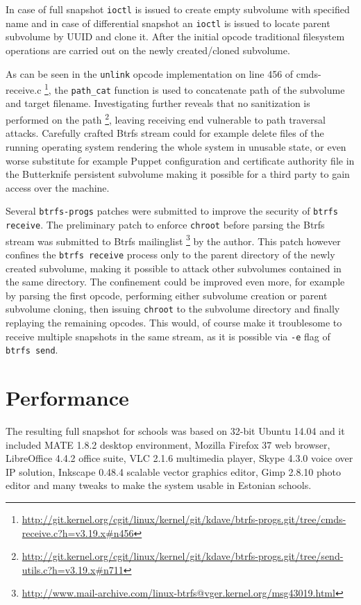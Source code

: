 \documentclass[a4paper,11pt]{kth-mag}
\begin{document}
In case of full snapshot \texttt{ioctl} is issued to
create empty subvolume with specified name and
in case of differential snapshot an \texttt{ioctl} is issued
to locate parent subvolume by UUID and clone it.
After the initial opcode traditional filesystem
operations are carried out on the newly
created/cloned subvolume.

As can be seen in the \texttt{unlink} opcode
implementation on line 456 of cmds-receive.c
\footnote{\url{http://git.kernel.org/cgit/linux/kernel/git/kdave/btrfs-progs.git/tree/cmds-receive.c?h=v3.19.x\#n456}},
the \texttt{path\_cat} function is used to concatenate
path of the subvolume and target filename.
Investigating further reveals that no sanitization is performed on the path
\footnote{\url{http://git.kernel.org/cgit/linux/kernel/git/kdave/btrfs-progs.git/tree/send-utils.c?h=v3.19.x\#n711}}, leaving receiving end vulnerable to path traversal attacks.
Carefully crafted Btrfs stream could for example delete files
of the running operating system rendering the whole system
in unusable state, or even worse substitute for example
Puppet configuration and certificate authority file in the
Butterknife persistent subvolume making it possible for a third party
to gain access over the machine.

Several \texttt{btrfs-progs} patches were submitted to improve
the security of \texttt{btrfs receive}.
The preliminary patch to enforce \texttt{chroot}
before parsing the Btrfs stream was submitted to Btrfs mailinglist
\footnote{\url{http://www.mail-archive.com/linux-btrfs@vger.kernel.org/msg43019.html}}
by the author.
This patch however confines the \texttt{btrfs receive}
process only to the parent directory of the newly created subvolume,
making it possible to attack other subvolumes contained in the same directory.
The confinement could be improved even more, for example
by parsing the first opcode, performing either
subvolume creation or parent subvolume cloning,
then issuing \texttt{chroot} to the subvolume directory
and finally replaying the remaining opcodes.
This would, of course make it troublesome to receive multiple
snapshots in the same stream, as it is possible via \texttt{-e}
flag of \texttt{btrfs send}.


\section{Performance}

The resulting full snapshot for schools was based on 32-bit Ubuntu 14.04 and
it included MATE 1.8.2 desktop environment, Mozilla Firefox 37 web browser,
LibreOffice 4.4.2 office suite,
VLC 2.1.6 multimedia player,
Skype 4.3.0 voice over IP solution,
Inkscape 0.48.4 scalable vector graphics editor,
Gimp 2.8.10 photo editor and many tweaks
to make the system usable in Estonian schools.
\end{document}
